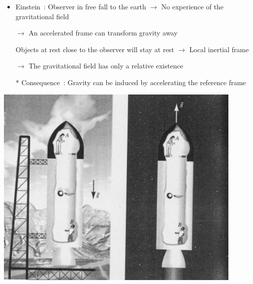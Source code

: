 \onecolumn
\begin{itemize}
\item Einstein~: Observer in free fall to the earth $\rightarrow$ No experience of the gravitational field
\item[] $\rightarrow$ An accelerated frame can transform gravity away
\item[] Objects at rest close to the observer will stay at rest $\rightarrow$ Local inertial frame
\item[] $\rightarrow$ {\red The gravitational field has only a relative existence}
\item[$\ast$] Consequence~: {\blue Gravity can be induced by accelerating the reference frame}
\end{itemize}
%
\begin{center}
 \hspace*{2cm}
\includegraphics[keepaspectratio,height=10cm]{equivalence}
\end{center}
